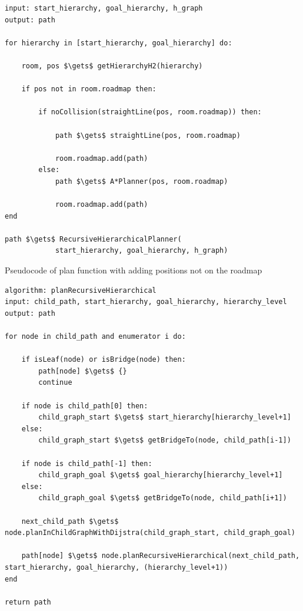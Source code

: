 \begin{lstlisting}[float=h]
input: start_hierarchy, goal_hierarchy, h_graph
output: path

for hierarchy in [start_hierarchy, goal_hierarchy] do:

    room, pos $\gets$ getHierarchyH2(hierarchy)
    
    if pos not in room.roadmap then:
    
        if noCollision(straightLine(pos, room.roadmap)) then:
        
            path $\gets$ straightLine(pos, room.roadmap)
            
            room.roadmap.add(path)
        else:
            path $\gets$ A*Planner(pos, room.roadmap)
            
            room.roadmap.add(path)
end

path $\gets$ RecursiveHierarchicalPlanner(
            start_hierarchy, goal_hierarchy, h_graph)

\end{lstlisting}

Pseudocode of plan function with adding positions not on the roadmap

\begin{lstlisting}[float=h]
algorithm: planRecursiveHierarchical
input: child_path, start_hierarchy, goal_hierarchy, hierarchy_level
output: path

for node in child_path and enumerator i do:

    if isLeaf(node) or isBridge(node) then:
        path[node] $\gets$ {}
        continue

    if node is child_path[0] then:
        child_graph_start $\gets$ start_hierarchy[hierarchy_level+1]
    else:
        child_graph_start $\gets$ getBridgeTo(node, child_path[i-1])

    if node is child_path[-1] then:
        child_graph_goal $\gets$ goal_hierarchy[hierarchy_level+1]
    else:
        child_graph_goal $\gets$ getBridgeTo(node, child_path[i+1])

    next_child_path $\gets$ node.planInChildGraphWithDijstra(child_graph_start, child_graph_goal)

    path[node] $\gets$ node.planRecursiveHierarchical(next_child_path, start_hierarchy, goal_hierarchy, (hierarchy_level+1))
end

return path

\end{lstlisting}

